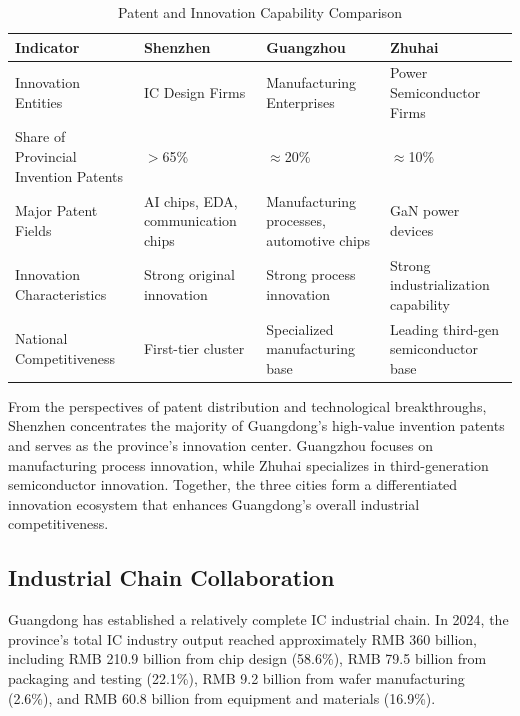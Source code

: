 \documentclass[12pt,a4paper]{article}
\newcommand{\tableHeaderRow}{\rowcolor{tealPrimary}\color{white}}
\newcommand{\tableOddRow}{\rowcolor{mintBG}}
\newcommand{\tableEvenRow}{\rowcolor{white}}
\begin{document}
\begin{table}[H]
\centering
\caption{Patent and Innovation Capability Comparison}
\label{tab:innovation_compare}
\begin{tabular}{p{2.5cm}p{3.5cm}p{3.5cm}p{3.5cm}}
\toprule
\tableHeaderRow
\textbf{Indicator} & \textbf{Shenzhen} & \textbf{Guangzhou} & \textbf{Zhuhai} \\
\midrule
\tableOddRow Innovation Entities & IC Design Firms & Manufacturing Enterprises & Power Semiconductor Firms \\
\tableEvenRow Share of Provincial Invention Patents & $>$65\% & $\approx$20\% & $\approx$10\% \\
\tableOddRow Major Patent Fields & AI chips, EDA, communication chips & Manufacturing processes, automotive chips & GaN power devices \\
\tableEvenRow Innovation Characteristics & Strong original innovation & Strong process innovation & Strong industrialization capability \\
\tableOddRow National Competitiveness & First-tier cluster & Specialized manufacturing base & Leading third-gen semiconductor base \\
\bottomrule
\end{tabular}
\end{table}

From the perspectives of patent distribution and technological
breakthroughs, Shenzhen concentrates the majority of Guangdong's
high-value invention patents and serves as the province's innovation
center. Guangzhou focuses on manufacturing process innovation, while
Zhuhai specializes in third-generation semiconductor innovation.
Together, the three cities form a differentiated innovation ecosystem
that enhances Guangdong's overall industrial competitiveness.

\subsection{Industrial Chain Collaboration}
\label{sec:chain_collaboration}

Guangdong has established a relatively complete IC industrial chain.
In 2024, the province's total IC industry output reached approximately
RMB 360 billion, including RMB 210.9 billion from chip design (58.6\%),
RMB 79.5 billion from packaging and testing (22.1\%), RMB 9.2 billion
from wafer manufacturing (2.6\%), and RMB 60.8 billion from equipment
and materials (16.9\%).
\end{document}
